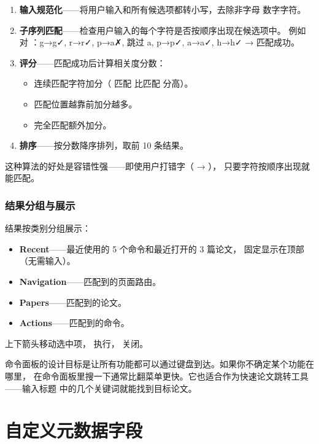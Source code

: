 \begin{enumerate}
  \item \textbf{输入规范化}——将用户输入和所有候选项都转小写，去除非字母
    数字字符。
  \item \textbf{子序列匹配}——检查用户输入的每个字符是否按顺序出现在候选项中。
    例如  对 ：g→g✓, r→r✓, p→a✗, 跳过 a, p→p✓,
    a→a✓, h→h✓ → 匹配成功。
  \item \textbf{评分}——匹配成功后计算相关度分数：
    \begin{itemize}
      \item 连续匹配字符加分（ 匹配  比匹配
         分高）。
      \item 匹配位置越靠前加分越多。
      \item 完全匹配额外加分。
    \end{itemize}
  \item \textbf{排序}——按分数降序排列，取前 10 条结果。
\end{enumerate}

这种算法的好处是容错性强——即使用户打错字（ → ），
只要字符按顺序出现就能匹配。

\subsection{结果分组与展示}

结果按类别分组展示：

\begin{itemize}
  \item \textbf{Recent}——最近使用的 5 个命令和最近打开的 3 篇论文，
    固定显示在顶部（无需输入）。
  \item \textbf{Navigation}——匹配到的页面路由。
  \item \textbf{Papers}——匹配到的论文。
  \item \textbf{Actions}——匹配到的命令。
\end{itemize}

上下箭头移动选中项， 执行， 关闭。

\begin{tipbox}
命令面板的设计目标是让所有功能都可以通过键盘到达。如果你不确定某个功能在哪里，
在命令面板里搜一下通常比翻菜单更快。它也适合作为快速论文跳转工具——输入标题
中的几个关键词就能找到目标论文。
\end{tipbox}

\chapter{自定义元数据字段}
\label{ch:custom-fields}

